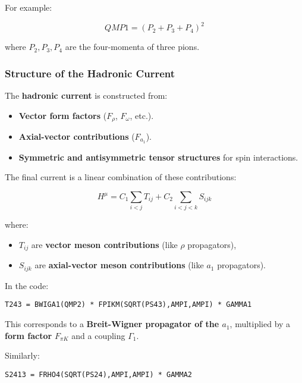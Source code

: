 \documentclass[12pt]{article}
\begin{document}
For example:

\begin{equation}
QMP1 = (P_2 + P_3 + P_4)^2
\end{equation}

where \( P_2, P_3, P_4 \) are the four-momenta of three pions.

\subsubsection{Structure of the Hadronic Current}

The \textbf{hadronic current} is constructed from:
\begin{itemize}
    \item \textbf{Vector form factors} (\( F_{\rho} \), \( F_{\omega} \), etc.).
    \item \textbf{Axial-vector contributions} (\( F_{a_1} \)).
    \item \textbf{Symmetric and antisymmetric tensor structures} for spin interactions.
\end{itemize}

The final current is a linear combination of these contributions:

\begin{equation}
H^\mu = C_1 \sum_{i<j} T_{ij} + C_2 \sum_{i<j<k} S_{ijk}
\end{equation}

where:
\begin{itemize}
    \item \( T_{ij} \) are \textbf{vector meson contributions} (like \( \rho \) propagators),
    \item \( S_{ijk} \) are \textbf{axial-vector meson contributions} (like \( a_1 \) propagators).
\end{itemize}

In the code:

\begin{verbatim}
T243 = BWIGA1(QMP2) * FPIKM(SQRT(PS43),AMPI,AMPI) * GAMMA1
\end{verbatim}

This corresponds to a \textbf{Breit-Wigner propagator of the \( a_1 \)}, multiplied by a \textbf{form factor} \( F_{\pi K} \) and a coupling \( \Gamma_1 \).

Similarly:

\begin{verbatim}
S2413 = FRHO4(SQRT(PS24),AMPI,AMPI) * GAMMA2
\end{verbatim}
\end{document}
